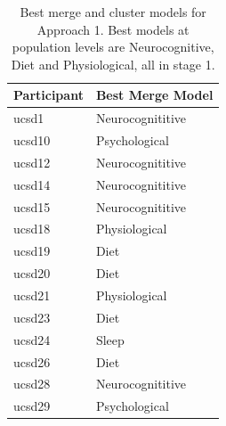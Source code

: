 \begin{table}[htbp] 
 \caption{Best merge and cluster models for Approach 1.  Best models at population levels are Neurocognitive, Diet and Physiological, all in stage 1.}
 \begin{tabularx}{\textwidth}{RR}
 \toprule
 \textbf{Participant} & \textbf{Best Merge Model} \\
 \midrule
 ucsd1  & Neurocognititive   \\
ucsd10 & Psychological      \\
ucsd12 & Neurocognititive   \\
ucsd14 & Neurocognititive   \\
ucsd15 & Neurocognititive   \\
ucsd18 & Physiological      \\
ucsd19 & Diet               \\
ucsd20 & Diet               \\
ucsd21 & Physiological      \\
ucsd23 & Diet               \\
ucsd24 & Sleep              \\
ucsd26 & Diet               \\
ucsd28 & Neurocognititive   \\
ucsd29 & Psychological      \\
 \bottomrule
 \end{tabularx}
 \label{tab:approach1_best_all}
\end{table}


